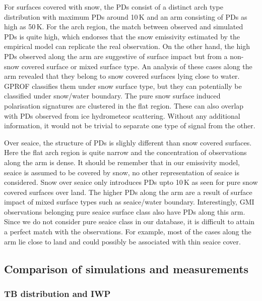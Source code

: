 \documentclass[amt, manuscript]{copernicus}
\begin{document}
For surfaces covered with snow, the PDs consist of a distinct arch type distribution with maximum PDs around 10\,K and an arm consisting of PDs as high as 50\,K. For the arch region, the match between observed and simulated PDs is quite high, which endorses that the snow emissivity estimated by the empirical model can replicate the real observation. On the other hand, the high PDs observed along the arm are suggestive of surface impact but from a non-snow covered surface or mixed surface type. An analysis of these cases along the arm revealed that they belong to snow covered surfaces lying close to water. GPROF classifies them under snow surface type, but they can potentially be classified under snow/water boundary. The pure snow surface induced polarisation signatures are clustered in the flat region. These can also overlap with PDs observed from ice hydrometeor scattering. Without any additional information, it would not be trivial to separate one type of signal from the other. 

Over seaice, the structure of PDs is slighly different than snow covered surfaces. Here the flat arch region is quite narrow and the concentration of observations along the arm is dense. It should be remember that in our emissivity model, seaice is assumed to be covered by snow, no other representation of seaice is considered. Snow over seaice only introduces PDs upto 10\,K as seen for pure snow covered surfaces over land. The higher PDs along the arm are a result of surface impact of mixed surface types such as seaice/water boundary. Interestingly, GMI observations belonging pure seaice surface class also have PDs along this arm. Since we do not consider pure seaice class in our database, it is difficult to attain a perfect match with the observations. For example, most of the cases along the arm lie close to land and could possibly be associated with thin seaice cover.  


\subsection{Comparison of simulations and measurements}
\label{sec:comparison_sim_obs}
\subsubsection{TB distribution and IWP}
\end{document}
